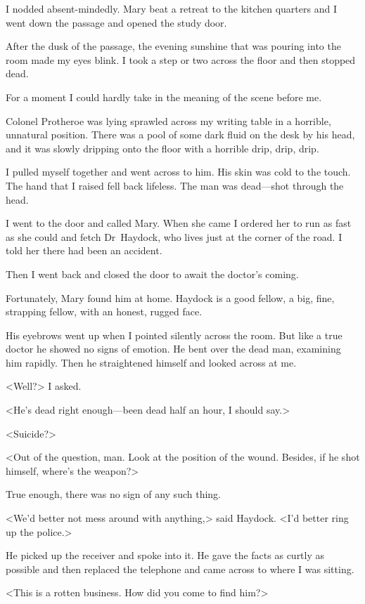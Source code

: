 I nodded absent-mindedly. Mary beat a retreat to the kitchen quarters and I went down the passage and opened the study door.

After the dusk of the passage, the evening sunshine that was pouring into the room made my eyes blink. I took a step or two across the floor and then stopped dead.

For a moment I could hardly take in the meaning of the scene before me.

Colonel Protheroe was lying sprawled across my writing table in a horrible, unnatural position. There was a pool of some dark fluid on the desk by his head, and it was slowly dripping onto the floor with a horrible drip, drip, drip.

I pulled myself together and went across to him. His skin was cold to the touch. The hand that I raised fell back lifeless. The man was dead—shot through the head.

I went to the door and called Mary. When she came I ordered her to run as fast as she could and fetch Dr~Haydock, who lives just at the corner of the road. I told her there had been an accident.

Then I went back and closed the door to await the doctor's coming.

Fortunately, Mary found him at home. Haydock is a good fellow, a big, fine, strapping fellow, with an honest, rugged face.

His eyebrows went up when I pointed silently across the room. But like a true doctor he showed no signs of emotion. He bent over the dead man, examining him rapidly. Then he straightened himself and looked across at me.

<Well?> I asked.

<He's dead right enough—been dead half an hour, I should say.>

<Suicide?>

<Out of the question, man. Look at the position of the wound. Besides, if he shot himself, where's the weapon?>

True enough, there was no sign of any such thing.

<We'd better not mess around with anything,> said Haydock. <I'd better ring up the police.>

He picked up the receiver and spoke into it. He gave the facts as curtly as possible and then replaced the telephone and came across to where I was sitting.

<This is a rotten business. How did you come to find him?>

